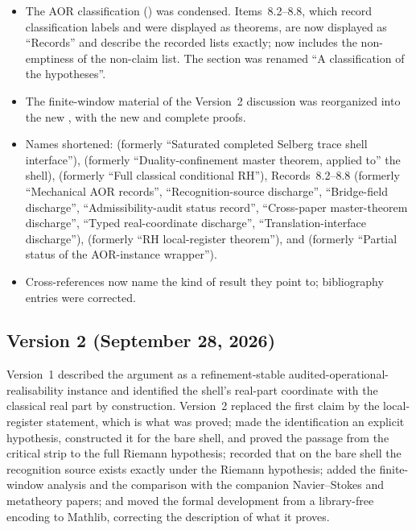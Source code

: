 \begin{itemize}
    resulting domination records exist if and only if the Riemann
    hypothesis holds.
  \item The AOR classification () was
    condensed.  Items~8.2--8.8, which record classification labels and
    were displayed as theorems, are now displayed as ``Records'' and
    describe the recorded lists exactly;  now
    includes the non-emptiness of the non-claim list.  The section was
    renamed ``A classification of the hypotheses''.
  \item The finite-window material of the Version~2 discussion was
    reorganized into the new , with the new
    and complete proofs.
  \item Names shortened:  (formerly
    ``Saturated completed Selberg trace shell interface''),
     (formerly ``Duality-confinement
    master theorem, applied to'' the shell),
     (formerly ``Full classical conditional
    RH''), Records~8.2--8.8 (formerly ``Mechanical AOR records'',
    ``Recognition-source discharge'', ``Bridge-field discharge'',
    ``Admissibility-audit status record'', ``Cross-paper master-theorem
    discharge'', ``Typed real-coordinate discharge'',
    ``Translation-interface discharge''),  (formerly ``RH local-register theorem''),
    and  (formerly ``Partial status of
    the AOR-instance wrapper'').
  \item Cross-references now name the kind of result they point to;
    bibliography entries were corrected.
\end{itemize}

\subsection*{Version 2 (September 28, 2026)}

Version~1 described the argument as a refinement-stable
audited-operational-realisability instance and identified the shell's
real-part coordinate with the classical real part by construction.
Version~2 replaced the first claim by the local-register statement,
which is what was proved; made the identification an explicit
hypothesis, constructed it for the bare shell, and proved the passage
from the critical strip to the full Riemann hypothesis; recorded that on
the bare shell the recognition source exists exactly under the Riemann
hypothesis; added the finite-window analysis and the comparison with
the companion Navier--Stokes and metatheory papers; and moved the formal
development from a library-free encoding to Mathlib, correcting the
description of what it proves.
\par\endgroup
